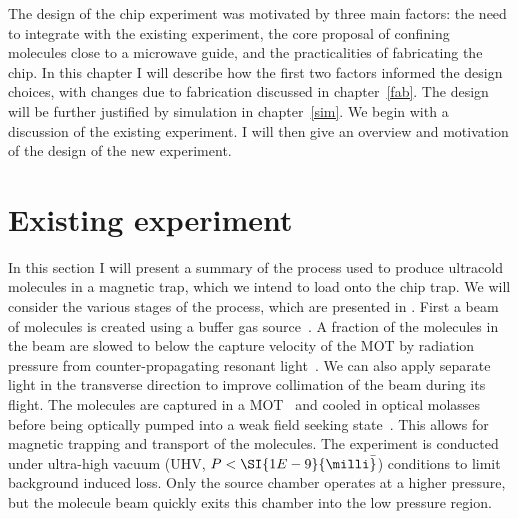 The design of the \CaF{} chip experiment was motivated by three main factors:
the need to integrate with the existing experiment, the core proposal of
confining molecules close to a microwave guide, and the practicalities of
fabricating the chip. In this chapter I will describe how the first two factors
informed the design choices, with changes due to fabrication discussed in
chapter~\ref{fab}. The design will be further justified by simulation in
chapter~\ref{sim}.
%
We begin with a discussion of the existing experiment. I will then give an
overview and motivation of the design of the new experiment.


\section{Existing \CaF{} experiment}
\label{overview:existing}

In this section I will present a summary of the process used to produce
ultracold \CaF{} molecules in a magnetic trap, which we intend to load onto the
chip trap. We will consider the various stages of the process, which are
presented in . First a beam of \CaF{}
molecules is created using a buffer gas source~\cite{Truppe2018}. A fraction of
the molecules in the beam are slowed to below the capture velocity of the MOT
by radiation pressure from counter-propagating resonant
light~\cite{Truppe2017a}. We can also apply separate light in the transverse direction
to improve collimation of the beam during its flight.
The molecules are captured in a MOT~\cite{Williams2017} and cooled in optical
molasses~\cite{Truppe2017} before being optically pumped into a weak field
seeking state~\cite{WilliamsMagnetic2018}. This allows for magnetic trapping
and transport of the molecules. The experiment is conducted under ultra-high
vacuum (UHV, $P<\SI{1E-9}{\milli\bar}$) conditions to limit background induced
loss. Only the source chamber operates at a higher pressure, but the molecule
beam quickly exits this chamber into the low pressure region. 

